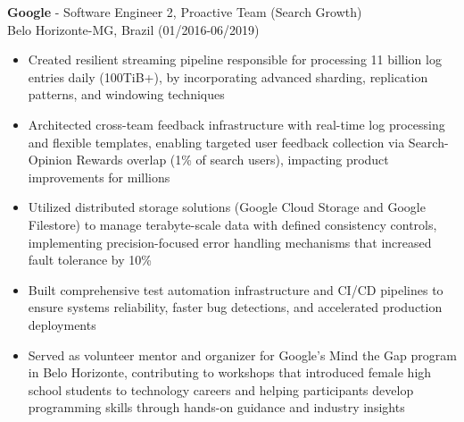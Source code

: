 
\normalsize{\textbf{Google} - Software Engineer 2, Proactive Team (Search Growth)}\\
\footnotesize{Belo Horizonte-MG, Brazil (01/2016-06/2019)}

\begin{itemize}
    \item \small{Created resilient streaming pipeline responsible for processing 11 billion log entries daily (100TiB+), by incorporating advanced sharding, replication patterns, and windowing techniques}

    \item \small{
        Architected cross-team feedback infrastructure with real-time log processing and flexible templates, enabling targeted user feedback collection via Search-Opinion Rewards overlap (1\% of search users), impacting product improvements for millions
    }

    \item \small{Utilized distributed storage solutions (Google Cloud Storage and Google Filestore) to manage terabyte-scale data with defined consistency controls, implementing precision-focused error handling mechanisms that increased fault tolerance by 10\%}

    \item \small{Built comprehensive test automation infrastructure and CI/CD pipelines to ensure systems reliability, faster bug detections, and accelerated production deployments}

    \clearpage

    \item \small{Served as volunteer mentor and organizer for Google's Mind the Gap program in Belo Horizonte, contributing to workshops that introduced female high school students to technology careers and helping participants develop programming skills through hands-on guidance and industry insights}
\end{itemize}
